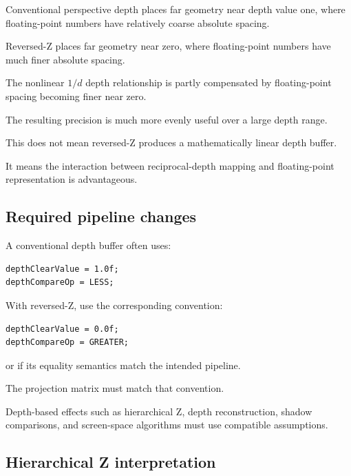 \hypertarget{02-foundations-ii-ch033-why-floating-point-reversed-z-works}{}

Conventional perspective depth places far geometry near depth value one, where floating-point numbers have relatively coarse absolute spacing.

Reversed-Z places far geometry near zero, where floating-point numbers have much finer absolute spacing.

The nonlinear \(1/d\) depth relationship is partly compensated by floating-point spacing becoming finer near zero.

The resulting precision is much more evenly useful over a large depth range.

This does not mean reversed-Z produces a mathematically linear depth buffer.

It means the interaction between reciprocal-depth mapping and floating-point representation is advantageous.

\subsection{Required pipeline changes}\label{02-foundations-ii-ch033-required-pipeline-changes}

\hypertarget{02-foundations-ii-ch033-required-pipeline-changes}{}

A conventional depth buffer often uses:

\begin{verbatim}
depthClearValue = 1.0f;
depthCompareOp = LESS;
\end{verbatim}

With reversed-Z, use the corresponding convention:

\begin{verbatim}
depthClearValue = 0.0f;
depthCompareOp = GREATER;
\end{verbatim}

or  if its equality semantics match the intended pipeline.

The projection matrix must match that convention.

Depth-based effects such as hierarchical Z, depth reconstruction, shadow comparisons, and screen-space algorithms must use compatible assumptions.

\subsection{Hierarchical Z interpretation}\label{02-foundations-ii-ch033-hierarchical-z-interpretation}

